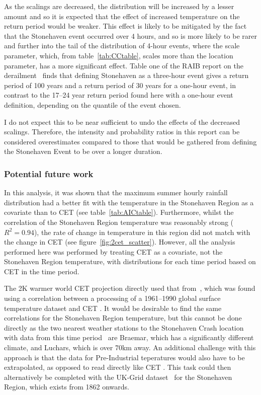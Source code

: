 As the scalings are decreased,
    the distribution will be increased by a lesser amount and so it is expected that the effect of increased temperature on the return period would be weaker.
This effect is likely to be mitigated by the fact that the Stonehaven event occurred over 4 hours,
    and so is more likely to be rarer and further into the tail of the distribution of 4-hour events,
    where the scale parameter,
    which, from table~\ref{tab:CCtable}, scales more than the location parameter,
    has a more significant effect.
Table one of the RAIB report on the derailment~\cite{RAIB_2022} finds that defining Stonehaven as a three-hour event gives a
    return period of 100 years and a return period of 30 years for a one-hour event,
    in contrast to the 17--24 year return period found here with a one-hour event definition,
    depending on the quantile of the event chosen.

I do not expect this to be near sufficient to undo the effects of the decreased scalings.
Therefore,
    the intensity and probability ratios in this report can be considered overestimates compared to those that would be
    gathered from defining the Stonehaven Event to be over a longer duration.

\subsubsection{Potential future work}

In this analysis,
    it was shown that the maximum summer hourly rainfall distribution had a better fit with the temperature in the Stonehaven Region
    as a covariate than to CET (see table~\ref{tab:AICtable}).
Furthermore,
    whilst the correlation of the Stonehaven Region temperature was reasonably strong ($R^2 = 0.94$),
    the rate of change in temperature in this region did not match with the change in CET (see figure~\ref{fig:2cet_scatter}).
However,
    all the analysis performed here was performed by treating CET as a covariate,
    not the Stonehaven Region temperature,
    with distributions for each time period based on CET in the time period.

The 2K warmer world CET projection directly used that from~\cite{Tett_Soon},
    which was found using a correlation between a processing of a 1961--1990 global surface temperature dataset and CET .
It would be desirable to find the same correlations for the Stonehaven Region temperature,
    but this cannot be done directly as the two nearest weather stations to the Stonehaven Crash location
    with data from this time period~\cite{Old_Stations} are Braemar,
    which has a significantly different climate,
    and Luchars, which is over 70km away.
An additional challenge with this approach is that the data for Pre-Industrial teperatures would also have
    to be extrapolated, as opposed to read directly like CET .
This task could then alternatively be completed with the UK-Grid dataset~\cite{UKGrid} for the Stonehaven Region,
    which exists from 1862 onwards.

